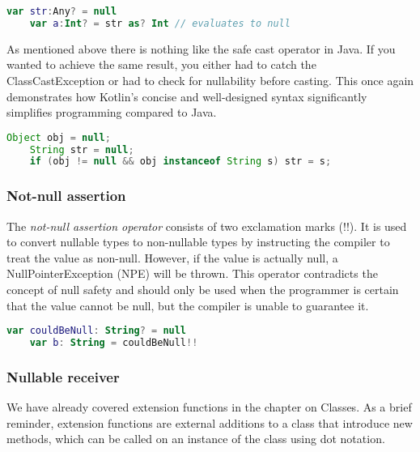 \documentclass[a4paper, 11pt]{article}
\begin{document}
  \begin{lstlisting}[language=Kotlin,title={Usage of the safe cast operator on a nullable value}]
    var str:Any? = null
    var a:Int? = str as? Int // evaluates to null
  \end{lstlisting}
    As mentioned above there is nothing like the safe cast operator in Java. If you wanted to achieve the same result, you either had to catch the ClassCastException or  had to check for nullability before casting. This once again demonstrates how Kotlin's concise and well-designed syntax significantly simplifies programming compared to Java.
  \begin{lstlisting}[language=Java,title={Functionality of safe call operator in java}]
    Object obj = null;
    String str = null;
    if (obj != null && obj instanceof String s) str = s;
  \end{lstlisting}

  \subsubsection{Not-null assertion}
    The \textit{not-null assertion operator} consists of two exclamation marks (!!). It is used to convert nullable types to non-nullable types by instructing the compiler to treat the value as non-null. However, if the value is actually null, a NullPointerException (NPE) will be thrown. This operator contradicts the concept of null safety and should only be used when the programmer is certain that the value cannot be null, but the compiler is unable to guarantee it.
  \begin{lstlisting}[language=Kotlin,title={Usage of the not-null assertion}]
    var couldBeNull: String? = null
    var b: String = couldBeNull!!
  \end{lstlisting}

  \subsubsection{Nullable receiver}
    We have already covered extension functions in the chapter on Classes. As a brief reminder, extension functions are external additions to a class that introduce new methods, which can be called on an instance of the class using dot notation.
\end{document}
